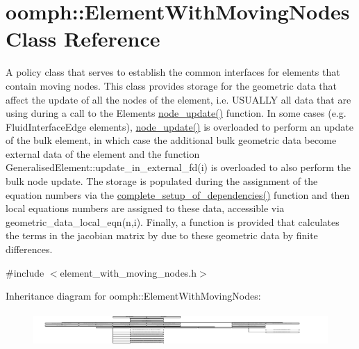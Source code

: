 \hypertarget{classoomph_1_1ElementWithMovingNodes}{}\section{oomph\+:\+:Element\+With\+Moving\+Nodes Class Reference}
\label{classoomph_1_1ElementWithMovingNodes}


A policy class that serves to establish the common interfaces for elements that contain moving nodes. This class provides storage for the geometric data that affect the update of all the nodes of the element, i.\+e. U\+S\+U\+A\+L\+LY all data that are using during a call to the Element\textquotesingle{}s \hyperlink{classoomph_1_1FiniteElement_ac27d707cb4f7c1429793c0fdb2fd093b}{node\+\_\+update()} function. In some cases (e.\+g. Fluid\+Interface\+Edge elements), \hyperlink{classoomph_1_1FiniteElement_ac27d707cb4f7c1429793c0fdb2fd093b}{node\+\_\+update()} is overloaded to perform an update of the bulk element, in which case the additional bulk geometric data become external data of the element and the function Generalised\+Element\+::update\+\_\+in\+\_\+external\+\_\+fd(i) is overloaded to also perform the bulk node update. The storage is populated during the assignment of the equation numbers via the \hyperlink{classoomph_1_1ElementWithMovingNodes_a6d2fa178f36d4b8413a9ce4f24e9c87e}{complete\+\_\+setup\+\_\+of\+\_\+dependencies()} function and then local equations numbers are assigned to these data, accessible via geometric\+\_\+data\+\_\+local\+\_\+eqn(n,i). Finally, a function is provided that calculates the terms in the jacobian matrix by due to these geometric data by finite differences.  




{\ttfamily \#include $<$element\+\_\+with\+\_\+moving\+\_\+nodes.\+h$>$}

Inheritance diagram for oomph\+:\+:Element\+With\+Moving\+Nodes\+:\begin{figure}[H]
\begin{center}
\leavevmode
\includegraphics[height=1.300000cm]{classoomph_1_1ElementWithMovingNodes}
\end{center}
\end{figure}
